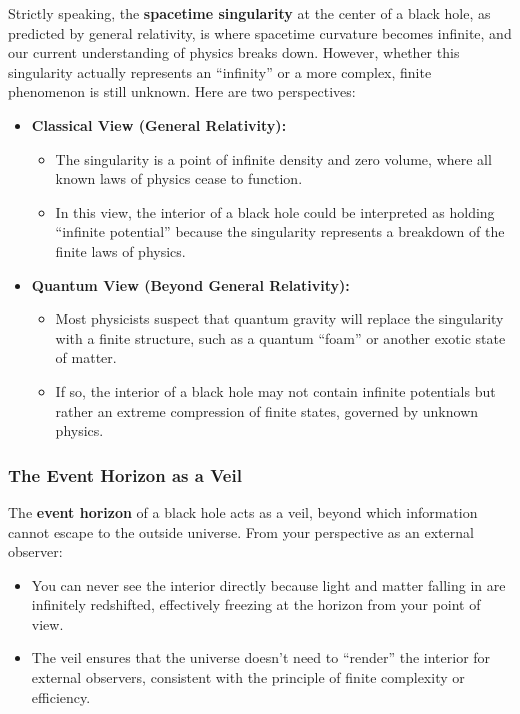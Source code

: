 \documentclass[12pt]{article}
\begin{document}
Strictly speaking, the \textbf{spacetime singularity} at the center of a black hole, as predicted by general relativity, is where spacetime curvature becomes infinite, and our current understanding of physics breaks down. However, whether this singularity actually represents an ``infinity'' or a more complex, finite phenomenon is still unknown. Here are two perspectives:

\begin{itemize}
    \item \textbf{Classical View (General Relativity):}
    \begin{itemize}
        \item The singularity is a point of infinite density and zero volume, where all known laws of physics cease to function.
        \item In this view, the interior of a black hole could be interpreted as holding ``infinite potential'' because the singularity represents a breakdown of the finite laws of physics.
    \end{itemize}
    
    \item \textbf{Quantum View (Beyond General Relativity):}
    \begin{itemize}
        \item Most physicists suspect that quantum gravity will replace the singularity with a finite structure, such as a quantum ``foam'' or another exotic state of matter.
        \item If so, the interior of a black hole may not contain infinite potentials but rather an extreme compression of finite states, governed by unknown physics.
    \end{itemize}
\end{itemize}

\subsubsection{The Event Horizon as a Veil}

The \textbf{event horizon} of a black hole acts as a veil, beyond which information cannot escape to the outside universe. From your perspective as an external observer:
\begin{itemize}
    \item You can never see the interior directly because light and matter falling in are infinitely redshifted, effectively freezing at the horizon from your point of view.
    \item The veil ensures that the universe doesn't need to ``render'' the interior for external observers, consistent with the principle of finite complexity or efficiency.
\end{itemize}
\end{document}
